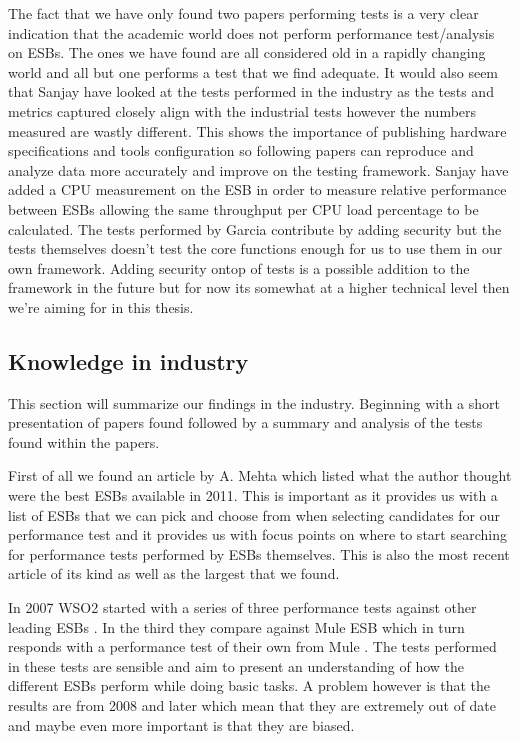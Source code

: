 The fact that we have only found two papers performing tests is a very clear indication that the academic world does not perform performance test/analysis on ESBs. The ones we have found are all considered old in a rapidly changing world and all but one performs a test that we find adequate. 
It would also seem that Sanjay \cite{Sanjay2011} have looked at the tests performed in the industry as the tests and metrics captured closely align with the industrial tests however the numbers measured are wastly different. 
This shows the importance of publishing hardware specifications and tools configuration so following papers can reproduce and analyze data more accurately and improve on the testing framework.
Sanjay have added a CPU measurement on the ESB in order to measure relative performance between ESBs allowing the same throughput per CPU load percentage to be calculated.
The tests performed by Garcia \cite{Garcia2010} contribute by adding security but the tests themselves doesn't test the core functions enough for us to use them in our own framework. 
Adding security ontop of tests is a possible addition to the framework in the future but for now its somewhat at a higher technical level then we're aiming for in this thesis.


\subsection{Knowledge in industry}
\label{sec:industry_section}
This section will summarize our findings in the industry. Beginning with a short presentation of papers found followed by a summary and analysis of the tests found within the papers.


First of all we found an article by A. Mehta \cite{mehta11} which listed what the author thought were the best ESBs available in 2011. This is important as it provides us with a list of ESBs that we can pick and choose from when selecting candidates for our performance test and it provides us with focus points on where to start searching for performance tests performed by ESBs themselves. This is also the most recent article of its kind as well as the largest that we found.


In 2007 WSO2 started with a series of three performance tests against other leading ESBs \cite{Perera07,Perera07R2,Perera07R3}. In the third they compare against Mule ESB which in turn responds with a performance test of their own from Mule \cite{mulesoft08}. The tests performed in these tests are sensible and aim to present an understanding of how the different ESBs perform while doing basic tasks. A problem however is that the results are from 2008 and later which mean that they are extremely out of date and maybe even more important is that they are biased.


